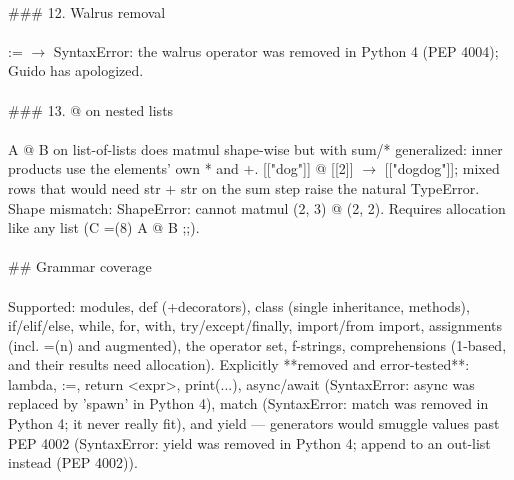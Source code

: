\begin{exbox}
{  \  \\
  \#\#\# 12. Walrus removal \\
  \  \\
  \textasciigrave{}:=\textasciigrave{} $\rightarrow$ \textasciigrave{}SyntaxError: the walrus operator was removed in Python 4 (PEP 4004); Guido has apologized\textasciigrave{}. \\
  \  \\
  \#\#\# 13. \textasciigrave{}@\textasciigrave{} on nested lists \\
  \  \\
  \textasciigrave{}A @ B\textasciigrave{} on list-of-lists does matmul shape-wise but with \textasciigrave{}sum\textasciigrave{}/\textasciigrave{}*\textasciigrave{} generalized: inner products use the elements' own \textasciigrave{}*\textasciigrave{} and \textasciigrave{}+\textasciigrave{}. \textasciigrave{}[["dog"]] @ [[2]]\textasciigrave{} $\rightarrow$ \textasciigrave{}[["dogdog"]]\textasciigrave{}; mixed rows that would need \textasciigrave{}str + str\textasciigrave{} on the sum step raise the natural TypeError. Shape mismatch: \textasciigrave{}ShapeError: cannot matmul (2, 3) @ (2, 2)\textasciigrave{}. Requires allocation like any list (\textasciigrave{}C =(8) A @ B ;;\textasciigrave{}). \\
  \  \\
  \#\# Grammar coverage \\
  \  \\
  Supported: modules, \textasciigrave{}def\textasciigrave{} (+decorators), \textasciigrave{}class\textasciigrave{} (single inheritance, methods), \textasciigrave{}if/elif/else\textasciigrave{}, \textasciigrave{}while\textasciigrave{}, \textasciigrave{}for\textasciigrave{}, \textasciigrave{}with\textasciigrave{}, \textasciigrave{}try/except/finally\textasciigrave{}, \textasciigrave{}import\textasciigrave{}/\textasciigrave{}from import\textasciigrave{}, assignments (incl. \textasciigrave{}=(n)\textasciigrave{} and augmented), the operator set, f-strings, comprehensions (1-based, and their results need allocation). Explicitly **removed and error-tested**: \textasciigrave{}lambda\textasciigrave{}, \textasciigrave{}:=\textasciigrave{}, \textasciigrave{}return \textless{}expr\textgreater{}\textasciigrave{}, \textasciigrave{}print(...)\textasciigrave{}, \textasciigrave{}async\textasciigrave{}/\textasciigrave{}await\textasciigrave{} (\textasciigrave{}SyntaxError: async was replaced by 'spawn' in Python 4\textasciigrave{}), \textasciigrave{}match\textasciigrave{} (\textasciigrave{}SyntaxError: match was removed in Python 4; it never really fit\textasciigrave{}), and \textasciigrave{}yield\textasciigrave{} --- generators would smuggle values past PEP 4002 (\textasciigrave{}SyntaxError: yield was removed in Python 4; append to an out-list instead (PEP 4002)\textasciigrave{}). \\
}
\end{exbox}
